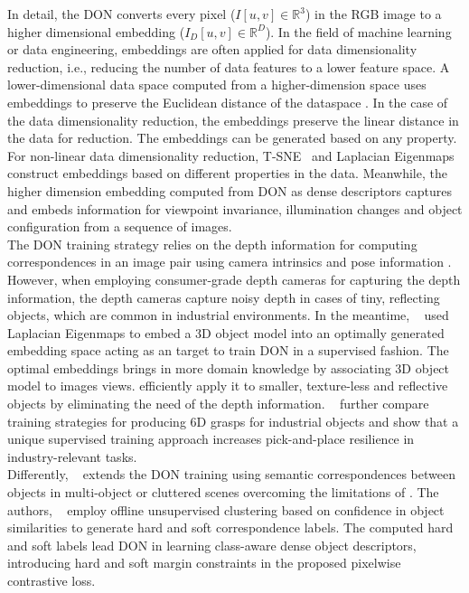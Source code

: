 In detail, the \ac{DON} converts every pixel ($I[u, v] \in \mathbb{R}^3$) in the \ac{RGB} image to a higher dimensional embedding ($I_D[u, v] \in \mathbb{R}^D$).
In the field of machine learning or data engineering, embeddings are often applied for data dimensionality reduction, i.e.,
reducing the number of data features to a lower feature space.
A lower-dimensional data space computed from a higher-dimension space uses embeddings to preserve the Euclidean distance of the dataspace \cite{fedoruk2018dimensionality}.
In the case of the data dimensionality reduction, the embeddings preserve the linear distance in the data for reduction.
The embeddings can be generated based on any property. For non-linear data dimensionality reduction,
T-SNE~\cite{tsne} and Laplacian Eigenmaps~\cite{belkin2003laplacian} construct embeddings based on different properties in the data.
Meanwhile, the higher dimension embedding computed from \ac{DON} as dense descriptors captures and embeds information for viewpoint invariance,
illumination changes and object configuration from a sequence of images.\\

The \ac{DON} training strategy relies on the depth information for computing correspondences in an image pair using camera intrinsics and pose information \cite{hartley2003multiple}.
However, when employing consumer-grade depth cameras for capturing the depth information,
the depth cameras capture noisy depth in cases of tiny, reflecting objects, which are common in
industrial environments.
In the meantime, \citeauthor{kupcsik2021supervised}~\cite{kupcsik2021supervised} used Laplacian Eigenmaps \cite{belkin2003laplacian}
to embed a 3D object model into an optimally generated embedding space acting as an target to train \ac{DON} in a supervised fashion.
The optimal embeddings brings in more domain knowledge by associating 3D object model to images views.
\citeauthor{kupcsik2021supervised} efficiently apply it to smaller, texture-less and
reflective objects by eliminating the need of the depth information. \citeauthor{kupcsik2021supervised}~\cite{kupcsik2021supervised}
further compare training strategies for producing 6D grasps for industrial objects and show that a unique supervised training approach increases pick-and-place resilience in industry-relevant tasks.\\

Differently, \citeauthor{hadjivelichkov2021fully}~\cite{hadjivelichkov2021fully} extends the \ac{DON} training using semantic correspondences between objects in multi-object
or cluttered scenes overcoming the limitations of \parencites{hartley2003multiple}{belkin2003laplacian}.
The authors, \citeauthor{hadjivelichkov2021fully}~\cite{hadjivelichkov2021fully} employ offline unsupervised clustering based on confidence in object similarities to generate hard and soft correspondence labels.
The computed hard and soft labels lead \ac{DON} in learning class-aware dense object descriptors, introducing hard and soft margin constraints in the proposed pixelwise contrastive loss.\\

